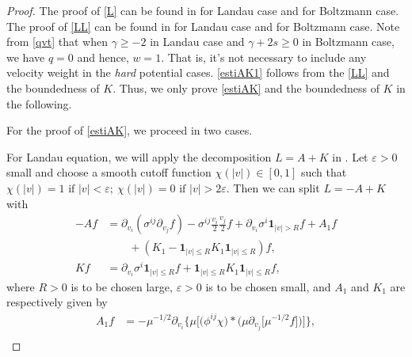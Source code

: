 \documentclass[reqno,a4paper]{amsart}
\numberwithin{equation}{section}
\newcommand{\1}{\mathbf{1}}
\newcommand{\<}{\langle}
\renewcommand{\>}{\rangle}
\begin{document}
\begin{proof} 
	The proof of \eqref{L} can be found in \cite[Lemma 5]{Guo2002a} for Landau case and \cite[(2.13)]{Gressman2011} for Boltzmann case. 
	The proof of \eqref{LL} can be found in \cite[Lemma 9]{Strain2007} for Landau case and \cite[Lemma 2.7]{Duan2013a} for Boltzmann case. 
	Note from \eqref{qvt} that when $\gamma\ge -2$ in Landau case and $\gamma+2s\ge 0$ in Boltzmann case, we have $q=0$ and hence, $w=1$. That is, it's not necessary to include any velocity weight in the {\em hard} potential cases. 
	\eqref{estiAK1} follows from the \eqref{LL} and the boundedness of $K$. Thus, we only prove \eqref{estiAK} and the boundedness of $K$ in the following. 
	
	For the proof of \eqref{estiAK}, we proceed in two cases. 
	
\medskip{}
For Landau equation, we will apply the decomposition $L=A+K$ in \cite[Section 4.2]{Yang2016}. Let $\varepsilon>0$ small and choose a smooth cutoff function $\chi(|v|)\in[0,1]$ such that 
$
	\chi(|v|)=1\text{ if } |v|<\varepsilon;\  \chi(|v|)=0 \text{ if } |v|>2\varepsilon.
$
Then we can split $L=-A+K$ with   
\begin{equation}\label{AK1}\begin{aligned}
		-Af &= \partial_{v_i}(\sigma^{ij}\partial_{v_j}f) - \sigma^{ij}\frac{v_i}{2}\frac{v_j}{2}f
		+\partial_{v_i}\sigma^i\1_{|v|> R}f+A_1f\\
		&\qquad+(K_1-\1_{|v|\le R}K_1\1_{|v|\le R})f,\\
		Kf &= \partial_{v_i}\sigma^i\1_{|v|\le R}f + \1_{|v|\le R}K_1\1_{|v|\le R}f,
	\end{aligned}
\end{equation}
where $R>0$ is to be chosen large, $\varepsilon>0$ is to be chosen small, and $A_1$ and $K_1$ are respectively given by 
\begin{align*}
	A_1f &= -\mu^{-1/2}\partial_{v_i}\Big\{\mu\Big[\Big(\phi^{ij}\chi\Big)*\Big(\mu\partial_{v_j}\big[\mu^{-1/2}f\big]\Big)\Big]\Big\},\\

\end{align*}
\end{proof}
\end{document}
